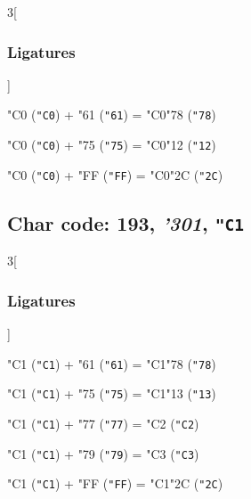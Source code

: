 \documentclass{article}
\newlength{\maxcharwidth}
\begin{document}
\begin{multicols}{3}[\subsubsection{Ligatures}]

{\testfont\char"C0\noboundary} ({\tt"C0}) + {\testfont\char"61\noboundary} ({\tt"61}) = {\testfont\char"C0\noboundary}{\testfont\char"78\noboundary} ({\tt"78}) 

{\testfont\char"C0\noboundary} ({\tt"C0}) + {\testfont\char"75\noboundary} ({\tt"75}) = {\testfont\char"C0\noboundary}{\testfont\char"12\noboundary} ({\tt"12}) 

{\testfont\char"C0\noboundary} ({\tt"C0}) + {\testfont\char"FF\noboundary} ({\tt"FF}) = {\testfont\char"C0\noboundary}{\testfont\char"2C\noboundary} ({\tt"2C}) 

\end{multicols}

\subsection{Char code: 193, {\it'301}, {\tt"C1}}
\label{char_193}


\begin{multicols}{3}[\subsubsection{Ligatures}]

{\testfont\char"C1\noboundary} ({\tt"C1}) + {\testfont\char"61\noboundary} ({\tt"61}) = {\testfont\char"C1\noboundary}{\testfont\char"78\noboundary} ({\tt"78}) 

{\testfont\char"C1\noboundary} ({\tt"C1}) + {\testfont\char"75\noboundary} ({\tt"75}) = {\testfont\char"C1\noboundary}{\testfont\char"13\noboundary} ({\tt"13}) 

{\testfont\char"C1\noboundary} ({\tt"C1}) + {\testfont\char"77\noboundary} ({\tt"77}) = {\testfont\char"C2\noboundary} ({\tt"C2}) 

{\testfont\char"C1\noboundary} ({\tt"C1}) + {\testfont\char"79\noboundary} ({\tt"79}) = {\testfont\char"C3\noboundary} ({\tt"C3}) 

{\testfont\char"C1\noboundary} ({\tt"C1}) + {\testfont\char"FF\noboundary} ({\tt"FF}) = {\testfont\char"C1\noboundary}{\testfont\char"2C\noboundary} ({\tt"2C}) 

\end{multicols}
\end{document}
